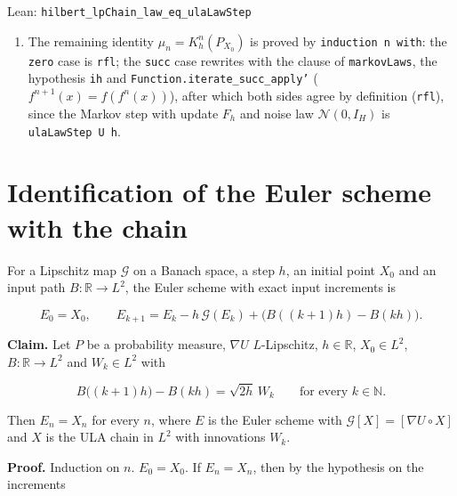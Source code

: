 \documentclass[11pt,a4paper]{article}
\begin{document}
\begin{leanbox}{Lean: \texttt{hilbert\_\allowbreak{}lpChain\_\allowbreak{}law\_\allowbreak{}eq\_\allowbreak{}ulaLawStep}}
\begin{enumerate}
\item The remaining identity \(\mu_n=K_h^n(P_{X_0})\) is proved by \texttt{induction n with}: the \texttt{zero} case is \texttt{rfl}; the \texttt{succ} case rewrites with the clause of \texttt{markov\allowbreak{}Laws}, the hypothesis \texttt{ih} and \texttt{Function.\allowbreak{}iterate\_\allowbreak{}succ\_\allowbreak{}apply'} (\(f^{n+1}(x)=f(f^n(x))\)), after which both sides agree by definition (\texttt{rfl}), since the Markov step with update \(F_h\) and noise law \(\mathcal N(0,I_H)\) is \texttt{ula\allowbreak{}Law\allowbreak{}Step U h}.

\end{enumerate}
\end{leanbox}

\section{\texorpdfstring{Identification of the Euler scheme with the chain}{Identification of the Euler scheme with the chain}}


For a Lipschitz map \(\mathcal G\) on a Banach space, a step \(h\), an initial point \(X_0\) and an input path \(B:\mathbb R\to L^2\), the Euler scheme with exact input increments is


\[E_0=X_0,\qquad E_{k+1}=E_k-h\,\mathcal G(E_k)+\bigl(B((k+1)h)-B(kh)\bigr).\]


\textbf{Claim.} Let \(P\) be a probability measure, \(\nabla U\) \(L\)-Lipschitz, \(h\in\mathbb R\), \(X_0\in L^2\), \(B:\mathbb R\to L^2\) and \(W_k\in L^2\) with


\[B\bigl((k+1)h\bigr)-B(kh)=\sqrt{2h}\,W_k\qquad\text{for every }k\in\mathbb N.\]


Then \(E_n=X_n\) for every \(n\), where \(E\) is the Euler scheme with \(\mathcal G[X]=[\nabla U\circ X]\) and \(X\) is the ULA chain in \(L^2\) with innovations \(W_k\).




\textbf{Proof.} Induction on \(n\). \(E_0=X_0\). If \(E_n=X_n\), then by the hypothesis on the increments
\end{document}
